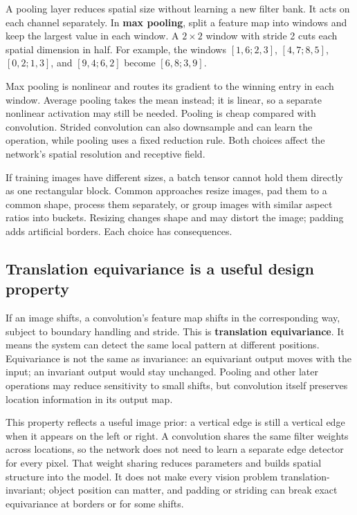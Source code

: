 A pooling layer reduces spatial size without learning a new filter bank. It acts on each channel separately. In \textbf{max pooling}, split a feature map into windows and keep the largest value in each window. A \(2\times2\) window with stride 2 cuts each spatial dimension in half. For example, the windows \([1,6;2,3]\), \([4,7;8,5]\), \([0,2;1,3]\), and \([9,4;6,2]\) become \([6,8;3,9]\).

Max pooling is nonlinear and routes its gradient to the winning entry in each window. Average pooling takes the mean instead; it is linear, so a separate nonlinear activation may still be needed. Pooling is cheap compared with convolution. Strided convolution can also downsample and can learn the operation, while pooling uses a fixed reduction rule. Both choices affect the network's spatial resolution and receptive field.

If training images have different sizes, a batch tensor cannot hold them directly as one rectangular block. Common approaches resize images, pad them to a common shape, process them separately, or group images with similar aspect ratios into buckets. Resizing changes shape and may distort the image; padding adds artificial borders. Each choice has consequences.

\subsection{Translation equivariance is a useful design property}\label{04-visual-computing-ii-ch031-translation-equivariance-is-a-useful-design-property}

If an image shifts, a convolution's feature map shifts in the corresponding way, subject to boundary handling and stride. This is \textbf{translation equivariance}. It means the system can detect the same local pattern at different positions. Equivariance is not the same as invariance: an equivariant output moves with the input; an invariant output would stay unchanged. Pooling and other later operations may reduce sensitivity to small shifts, but convolution itself preserves location information in its output map.

This property reflects a useful image prior: a vertical edge is still a vertical edge when it appears on the left or right. A convolution shares the same filter weights across locations, so the network does not need to learn a separate edge detector for every pixel. That weight sharing reduces parameters and builds spatial structure into the model. It does not make every vision problem translation-invariant; object position can matter, and padding or striding can break exact equivariance at borders or for some shifts.

